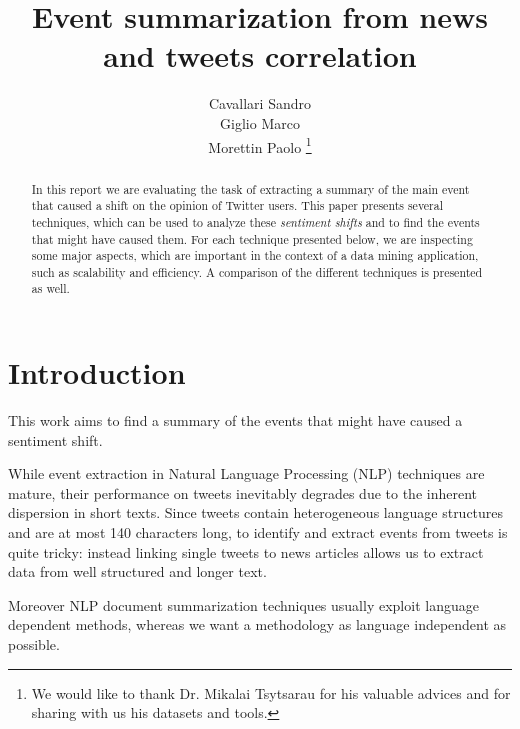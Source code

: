 \documentclass{acm_proc_article-sp-sigmod07}
\begin{document}
\title{Event summarization from news and tweets correlation}
\author{Cavallari Sandro\\Giglio Marco\\Morettin Paolo
\thanks{We would like to thank Dr. Mikalai Tsytsarau for his valuable advices and for sharing with us his datasets and tools.}}

%
\maketitle
\begin{abstract}
In this report we are evaluating the task of extracting a summary of the main event that caused a shift on the opinion of Twitter users. 
This paper presents several techniques, which can be used to analyze these \emph{sentiment shifts} and to find the events that might have caused them.
For each technique presented below, we are inspecting some major aspects, which are important in the context of a data mining application, such as scalability and efficiency.
 A comparison of the different techniques is presented as well.
 \end{abstract}   

\section{Introduction}
This work aims to find a summary of the events that might have caused a sentiment shift.

While event extraction in Natural Language Processing (NLP) techniques are mature, their performance on tweets inevitably degrades due to the inherent dispersion in short texts. Since tweets contain heterogeneous language structures and are at most 140 characters long, to identify and extract events from tweets is quite tricky: instead linking single tweets to news articles allows us to extract data from well structured and longer text.



Moreover NLP document summarization techniques usually exploit language dependent methods, whereas we want a methodology as language independent as possible.
\end{document}
